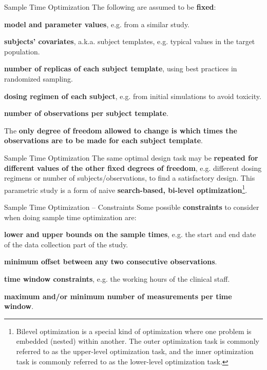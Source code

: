 \documentclass[aspectratio=169]{beamer}                    %
\begin{document}
\begin{frame}{Sample Time Optimization}
	The following are assumed to be \textbf{fixed}:
	\begin{vfilleditems}
		\item \textbf{model and parameter values}, e.g. from a similar study.
		\item \textbf{subjects' covariates}, a.k.a. subject templates, e.g.
		typical values in the target population.
		\item \textbf{number of replicas of each subject template},
		using best practices in randomized sampling.
		\item \textbf{dosing regimen of each subject},
		e.g. from initial simulations to avoid toxicity.
		\item \textbf{number of observations per subject template}.
	\end{vfilleditems}
	The \textbf{only degree of freedom allowed to change is which times the observations
		are to be made for each subject template}.
\end{frame}

\begin{frame}{Sample Time Optimization}
	The same optimal design task may be \textbf{repeated for different values of the
		other fixed degrees of freedom},
	e.g. different dosing regimens or number of subjects/observations,
	to find a satisfactory design.
	\vfill
	This parametric study is a form of naive
	\textbf{search-based, bi-level optimization}\footnote{
		Bilevel optimization is a special kind of optimization where one problem is embedded (nested) within another.
		The outer optimization task is commonly referred to as the upper-level optimization task,
		and the inner optimization task is commonly referred to as the lower-level optimization task.}.
\end{frame}

\begin{frame}{Sample Time Optimization -- Constraints}
	Some possible \textbf{constraints} to consider when doing sample time optimization are:
	\begin{vfilleditems}
		\item \textbf{lower and upper bounds on the sample times},
		e.g. the start and end date of the data collection part of the study.
		\item \textbf{minimum offset between any two consecutive observations}.
		\item \textbf{time window constraints},
		e.g. the working hours of the clinical staff.
		\item \textbf{maximum and/or minimum number of measurements per time window}.
	\end{vfilleditems}
\end{frame}
\end{document}
